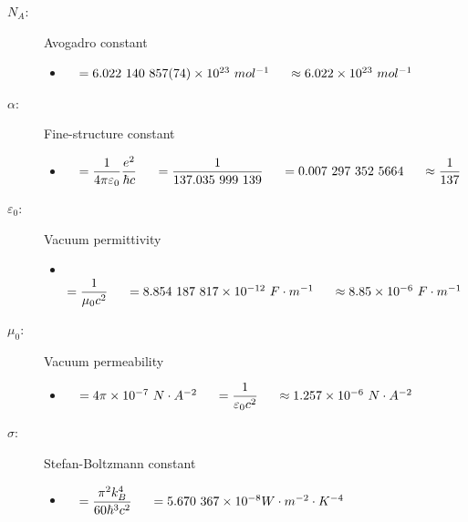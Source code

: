 \documentclass[]{report}
\newcommand \tab[1][1cm]{\hspace*{#1}}
\newcommand{\items}{\item\ \ }
\begin{document}
\begin{description}
\item[$N_A$:] Avogadro constant
\begin{itemize}
\items $ = 6.022\ 140\ 857 (74) \times 10^{23} \ mol^{-1} \tab[0.5cm] \approx 6.022 \times 10^{23} \ mol^{-1}$
\end{itemize}				

\item[$\alpha$:] Fine-structure constant
\begin{itemize}
\items $ = \dfrac{1}{4\pi\varepsilon_0}\dfrac{e^2}{\hbar c} \tab[0.5cm] = \dfrac{1}{137.035\ 999\ 139} \tab[0.5cm] = 0.007\ 297\ 352\ 5664 \tab[0.5cm] \approx \dfrac{1}{137} $
\end{itemize}		

\item[$\varepsilon_0$:] Vacuum permittivity
\begin{itemize}
\items $ = \dfrac{1}{\mu_0 c^2}\tab[0.5cm] = 8.854\ 187\ 817 \times 10^{-12} \ F \cdot m^{-1}\tab[0.5cm] \approx 8.85\times 10^{-6}\ F \cdot m^{-1}  $
\end{itemize}			

\item[$\mu_0$:] Vacuum permeability
\begin{itemize}
\items $ = 4\pi \times 10^{-7}\ N\cdot A^{-2}\tab[0.5cm] = \dfrac{1}{\varepsilon_0 c^2} \tab[0.5cm] \approx 1.257 \times 10^{-6}\ N\cdot A^{-2}  $
\end{itemize}
				
\item[$\sigma:$] Stefan-Boltzmann constant
\begin{itemize}
\items $ = \dfrac{\pi^2 k_B^4}{60\hbar^3 c^2} \tab[0.5cm] = 5.670\ 367 \times 10^{-8} W \cdot m^{-2} \cdot K^{-4} $
\end{itemize}

\end{description}
\end{document}
